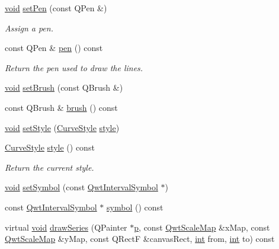 \begin{DoxyCompactItemize}
\hyperlink{group___u_a_v_objects_plugin_ga444cf2ff3f0ecbe028adce838d373f5c}{void} \hyperlink{class_qwt_plot_interval_curve_a706a3e88fbec2ab48a1a3e91c61cd223}{set\-Pen} (const Q\-Pen \&)
\begin{DoxyCompactList}\small\item\em Assign a pen. \end{DoxyCompactList}\item 
const Q\-Pen \& \hyperlink{class_qwt_plot_interval_curve_a942952ad07550f271a57db4cf5211ea8}{pen} () const 
\begin{DoxyCompactList}\small\item\em Return the pen used to draw the lines. \end{DoxyCompactList}\item 
\hyperlink{group___u_a_v_objects_plugin_ga444cf2ff3f0ecbe028adce838d373f5c}{void} \hyperlink{class_qwt_plot_interval_curve_a3102b513c27c54775fd371858aa31bba}{set\-Brush} (const Q\-Brush \&)
\item 
const Q\-Brush \& \hyperlink{class_qwt_plot_interval_curve_ad4aaae77788ba7bafd87ca8ec1970901}{brush} () const 
\item 
\hyperlink{group___u_a_v_objects_plugin_ga444cf2ff3f0ecbe028adce838d373f5c}{void} \hyperlink{class_qwt_plot_interval_curve_a74e6c2bf66e0436e827b5b017b943cad}{set\-Style} (\hyperlink{class_qwt_plot_interval_curve_aaef834575b923e1b317f4a86b2d97cd2}{Curve\-Style} \hyperlink{class_qwt_plot_interval_curve_ada1fea7fe0359c1bc175b3a2baf10c87}{style})
\item 
\hyperlink{class_qwt_plot_interval_curve_aaef834575b923e1b317f4a86b2d97cd2}{Curve\-Style} \hyperlink{class_qwt_plot_interval_curve_ada1fea7fe0359c1bc175b3a2baf10c87}{style} () const 
\begin{DoxyCompactList}\small\item\em Return the current style. \end{DoxyCompactList}\item 
\hyperlink{group___u_a_v_objects_plugin_ga444cf2ff3f0ecbe028adce838d373f5c}{void} \hyperlink{class_qwt_plot_interval_curve_a4bc2408868638a41f5baa70b759283a2}{set\-Symbol} (const \hyperlink{class_qwt_interval_symbol}{Qwt\-Interval\-Symbol} $\ast$)
\item 
const \hyperlink{class_qwt_interval_symbol}{Qwt\-Interval\-Symbol} $\ast$ \hyperlink{class_qwt_plot_interval_curve_a178654ee5b40932b06bbfcf5cb96ca7e}{symbol} () const 
\item 
virtual \hyperlink{group___u_a_v_objects_plugin_ga444cf2ff3f0ecbe028adce838d373f5c}{void} \hyperlink{class_qwt_plot_interval_curve_add274e6e29ff2df9b6961f3ed5ebcd5e}{draw\-Series} (Q\-Painter $\ast$\hyperlink{glext_8h_aa5367c14d90f462230c2611b81b41d23}{p}, const \hyperlink{class_qwt_scale_map}{Qwt\-Scale\-Map} \&x\-Map, const \hyperlink{class_qwt_scale_map}{Qwt\-Scale\-Map} \&y\-Map, const Q\-Rect\-F \&canvas\-Rect, \hyperlink{ioapi_8h_a787fa3cf048117ba7123753c1e74fcd6}{int} from, \hyperlink{ioapi_8h_a787fa3cf048117ba7123753c1e74fcd6}{int} to) const 

\end{DoxyCompactItemize}
